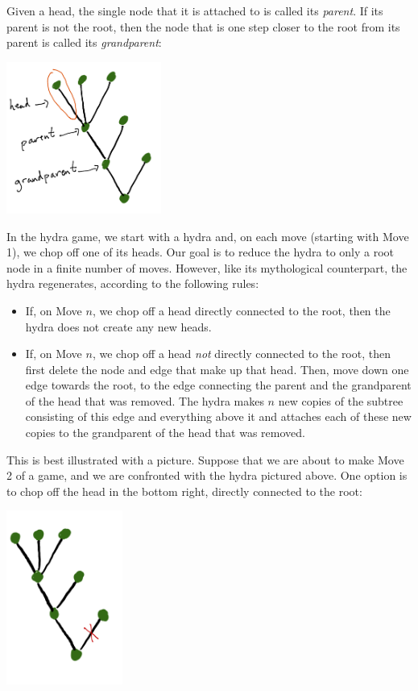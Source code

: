 \documentclass[a4paper]{memoir}
\theoremstyle{definition}
\begin{document}
Given a head, the single node that it is attached to is called its \emph{parent}. If its 
parent is not the root, then the node that is one step closer to the root from its parent 
is called its \emph{grandparent}:
\begin{center}  
\includegraphics[width=2in]{HydraFamily}
\end{center}

In the hydra game, we start with a hydra and, on each move (starting with Move 1), we chop off 
one of its heads. Our goal is to reduce the hydra to only a root node in a finite number of moves. 
However, like its mythological counterpart, the hydra regenerates, according to the following rules:
\begin{itemize}
  \item If, on Move $n$, we chop off a head directly connected to the root, then the hydra does not 
  create any new heads.
  \item If, on Move $n$, we chop off a head \emph{not} directly connected to the root, then 
  first delete the node and edge that make up that head. Then, move down one edge towards the 
  root, to the edge connecting the parent and the grandparent of the head that was removed. 
  The hydra makes $n$ new copies of the subtree consisting of this edge and everything above it 
  and attaches each of these new copies to the grandparent of the head that was removed.
\end{itemize}

This is best illustrated with a picture. Suppose that we are about to make Move 2 of a game, and we 
are confronted with the hydra pictured above. One option is to chop off the head in the bottom 
right, directly connected to the root:
\begin{center}
  \includegraphics[width=1.5in]{Hydra3}
\end{center}
\end{document}
